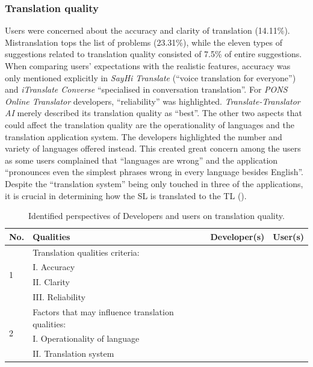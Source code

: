 \documentclass[english]{textolivre}
\newcommand{\cmark}{\ding{51}}%
\newcommand{\xmark}{\ding{55}}%
\begin{document}
\subsubsection{Translation quality}\label{sec-contributors-expl}
Users were concerned about the accuracy and clarity of translation (14.11\%). Mistranslation tops the list of problems (23.31\%), while the eleven types of suggestions related to translation quality consisted of 7.5\% of entire suggestions. When comparing users’ expectations with the realistic features, accuracy was only mentioned explicitly in \textit{SayHi Translate} (“voice translation for everyone”) and \textit{iTranslate Converse} “specialised in conversation translation”.  For \textit{PONS Online Translator} developers, “reliability” was highlighted. \textit{Translate-Translator AI} merely described its translation quality as “best”. The other two aspects that could affect the translation quality are the operationality of languages and the translation application system. The developers highlighted the number and variety of languages offered instead. This created great concern among the users as some users complained that “languages are wrong” and the application “pronounces even the simplest phrases wrong in every language besides English”. Despite the “translation system” being only touched in three of the applications, it is crucial in determining how the SL is translated to the TL ().

\begin{table}[h!]
\centering
\begin{threeparttable}
\caption{Identified perspectives of Developers and users on translation quality.}
\label{tbl5}
\footnotesize
\begin{tabular}{p{1cm} p{5cm} p{2cm} p{2cm}}
\toprule
No. & Qualities & Developer(s) & User(s) \\ 
\midrule
\multirow{4}{=}{1} & Translation qualities criteria: & & \\
& I. Accuracy & \cmark & \cmark \\
& II. Clarity & \xmark & \cmark \\
& III. Reliability & \cmark & \xmark \\
\midrule
\multirow{3}{=}{2} & Factors that may influence translation qualities: & & \\
& I. Operationality of language & \xmark & \cmark \\
& II. Translation system & \cmark & \xmark \\
\bottomrule
\end{tabular}
\end{threeparttable}
\end{table}
\end{document}
